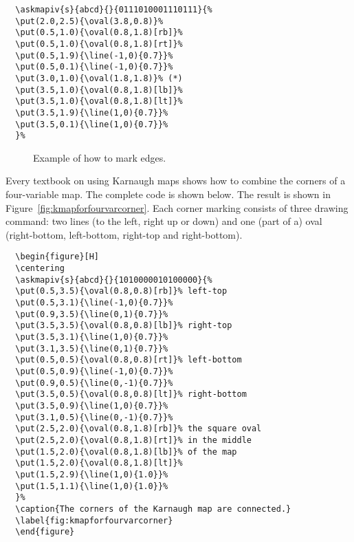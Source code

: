 \documentclass[a4paper,10pt]{ltxdoc}
\begin{document}
\bigskip
\begin{minipage}[c]{0.5\textwidth}
\begin{verbatim}
  \askmapiv{s}{abcd}{}{0111010001110111}{%
  \put(2.0,2.5){\oval(3.8,0.8)}%
  \put(0.5,1.0){\oval(0.8,1.8)[rb]}%
  \put(0.5,1.0){\oval(0.8,1.8)[rt]}%
  \put(0.5,1.9){\line(-1,0){0.7}}%
  \put(0.5,0.1){\line(-1,0){0.7}}%
  \put(3.0,1.0){\oval(1.8,1.8)}% (*)
  \put(3.5,1.0){\oval(0.8,1.8)[lb]}%
  \put(3.5,1.0){\oval(0.8,1.8)[lt]}%
  \put(3.5,1.9){\line(1,0){0.7}}%
  \put(3.5,0.1){\line(1,0){0.7}}%
  }%
\end{verbatim}
\end{minipage}\hfill%
\begin{minipage}[c]{0.5\textwidth}
\vspace*{-2\baselineskip}
\begin{figure}[H]
\centering
{}%
\caption{Example of how to mark edges.}
\label{fig:kmapsthreemarkedges2}
\end{figure}
\end{minipage}
\bigskip



Every textbook on using Karnaugh maps shows how to combine the corners of a
four-variable map. The complete code is shown below. The result is shown in
Figure~\ref{fig:kmapforfourvarcorner}. Each corner marking
consists of three drawing command: two lines (to the left, right up or
down) and one (part of a) oval (right-bottom, left-bottom, right-top
and right-bottom).


\begin{verbatim}
  \begin{figure}[H]
  \centering
  \askmapiv{s}{abcd}{}{1010000010100000}{%
  \put(0.5,3.5){\oval(0.8,0.8)[rb]}% left-top
  \put(0.5,3.1){\line(-1,0){0.7}}%
  \put(0.9,3.5){\line(0,1){0.7}}%
  \put(3.5,3.5){\oval(0.8,0.8)[lb]}% right-top
  \put(3.5,3.1){\line(1,0){0.7}}%
  \put(3.1,3.5){\line(0,1){0.7}}%
  \put(0.5,0.5){\oval(0.8,0.8)[rt]}% left-bottom
  \put(0.5,0.9){\line(-1,0){0.7}}%
  \put(0.9,0.5){\line(0,-1){0.7}}%
  \put(3.5,0.5){\oval(0.8,0.8)[lt]}% right-bottom
  \put(3.5,0.9){\line(1,0){0.7}}%
  \put(3.1,0.5){\line(0,-1){0.7}}%
  \put(2.5,2.0){\oval(0.8,1.8)[rb]}% the square oval
  \put(2.5,2.0){\oval(0.8,1.8)[rt]}% in the middle
  \put(1.5,2.0){\oval(0.8,1.8)[lb]}% of the map
  \put(1.5,2.0){\oval(0.8,1.8)[lt]}%
  \put(1.5,2.9){\line(1,0){1.0}}%
  \put(1.5,1.1){\line(1,0){1.0}}%
  }%
  \caption{The corners of the Karnaugh map are connected.}
  \label{fig:kmapforfourvarcorner}
  \end{figure}
\end{verbatim}
\end{document}
